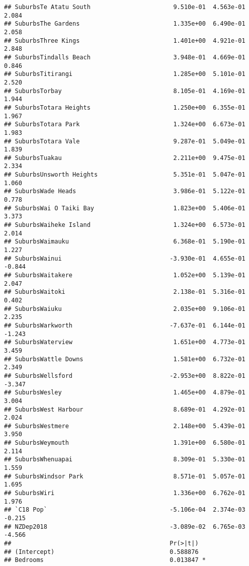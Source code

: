 \documentclass[
]{article}
\begin{document}
\begin{verbatim}
## SuburbsTe Atatu South                       9.510e-01  4.563e-01   2.084
## SuburbsThe Gardens                          1.335e+00  6.490e-01   2.058
## SuburbsThree Kings                          1.401e+00  4.921e-01   2.848
## SuburbsTindalls Beach                       3.948e-01  4.669e-01   0.846
## SuburbsTitirangi                            1.285e+00  5.101e-01   2.520
## SuburbsTorbay                               8.105e-01  4.169e-01   1.944
## SuburbsTotara Heights                       1.250e+00  6.355e-01   1.967
## SuburbsTotara Park                          1.324e+00  6.673e-01   1.983
## SuburbsTotara Vale                          9.287e-01  5.049e-01   1.839
## SuburbsTuakau                               2.211e+00  9.475e-01   2.334
## SuburbsUnsworth Heights                     5.351e-01  5.047e-01   1.060
## SuburbsWade Heads                           3.986e-01  5.122e-01   0.778
## SuburbsWai O Taiki Bay                      1.823e+00  5.406e-01   3.373
## SuburbsWaiheke Island                       1.324e+00  6.573e-01   2.014
## SuburbsWaimauku                             6.368e-01  5.190e-01   1.227
## SuburbsWainui                              -3.930e-01  4.655e-01  -0.844
## SuburbsWaitakere                            1.052e+00  5.139e-01   2.047
## SuburbsWaitoki                              2.138e-01  5.316e-01   0.402
## SuburbsWaiuku                               2.035e+00  9.106e-01   2.235
## SuburbsWarkworth                           -7.637e-01  6.144e-01  -1.243
## SuburbsWaterview                            1.651e+00  4.773e-01   3.459
## SuburbsWattle Downs                         1.581e+00  6.732e-01   2.349
## SuburbsWellsford                           -2.953e+00  8.822e-01  -3.347
## SuburbsWesley                               1.465e+00  4.879e-01   3.004
## SuburbsWest Harbour                         8.689e-01  4.292e-01   2.024
## SuburbsWestmere                             2.148e+00  5.439e-01   3.950
## SuburbsWeymouth                             1.391e+00  6.580e-01   2.114
## SuburbsWhenuapai                            8.309e-01  5.330e-01   1.559
## SuburbsWindsor Park                         8.571e-01  5.057e-01   1.695
## SuburbsWiri                                 1.336e+00  6.762e-01   1.976
## `C18 Pop`                                  -5.106e-04  2.374e-03  -0.215
## NZDep2018                                  -3.089e-02  6.765e-03  -4.566
##                                            Pr(>|t|)    
## (Intercept)                                0.588876    
## Bedrooms                                   0.013847 *  

\end{verbatim}
\end{document}
